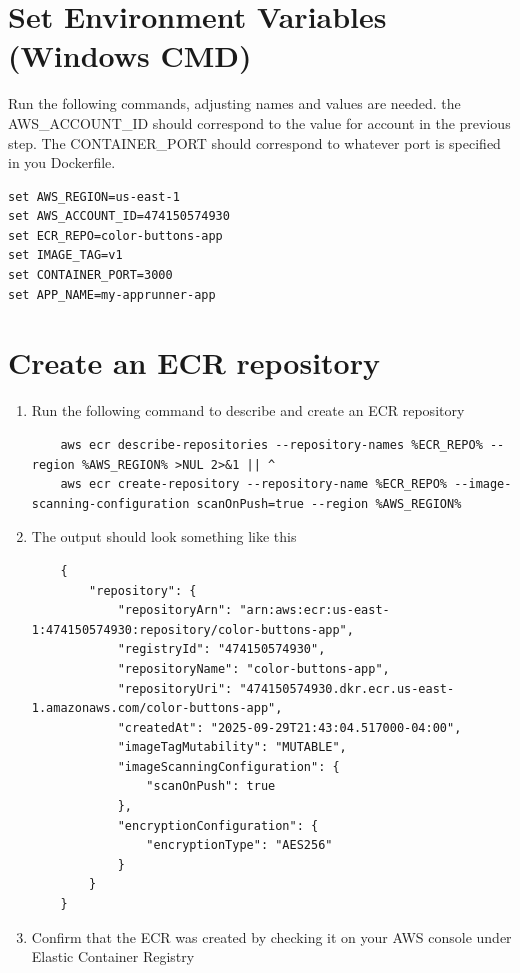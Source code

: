 \section{Set Environment Variables (Windows CMD)}

Run the following commands, adjusting names and values are needed. the AWS\_ACCOUNT\_ID should correspond to the value for account in the previous step. The CONTAINER\_PORT should correspond to whatever port is specified in you Dockerfile.
\begin{verbatim}
set AWS_REGION=us-east-1
set AWS_ACCOUNT_ID=474150574930
set ECR_REPO=color-buttons-app
set IMAGE_TAG=v1
set CONTAINER_PORT=3000
set APP_NAME=my-apprunner-app
\end{verbatim}

\section{Create an ECR repository}
\begin{enumerate}
    \item Run the following command to describe and create an ECR repository 
    \begin{verbatim}
    aws ecr describe-repositories --repository-names %ECR_REPO% --region %AWS_REGION% >NUL 2>&1 || ^
    aws ecr create-repository --repository-name %ECR_REPO% --image-scanning-configuration scanOnPush=true --region %AWS_REGION%
    \end{verbatim}
    \item The output should look something like this\begin{verbatim}
    {
        "repository": {
            "repositoryArn": "arn:aws:ecr:us-east-1:474150574930:repository/color-buttons-app",
            "registryId": "474150574930",
            "repositoryName": "color-buttons-app",
            "repositoryUri": "474150574930.dkr.ecr.us-east-1.amazonaws.com/color-buttons-app",
            "createdAt": "2025-09-29T21:43:04.517000-04:00",
            "imageTagMutability": "MUTABLE",
            "imageScanningConfiguration": {
                "scanOnPush": true
            },
            "encryptionConfiguration": {
                "encryptionType": "AES256"
            }
        }
    }
    \end{verbatim}
    \item Confirm that the ECR was created by checking it on your AWS console under Elastic Container Registry

\end{enumerate}



